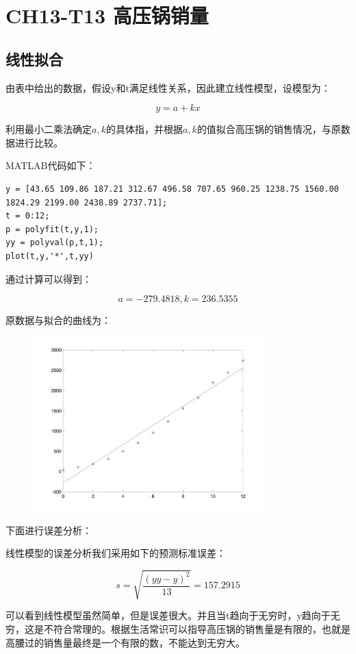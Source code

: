 \documentclass{article}
\begin{document}
\section{CH13-T13 高压锅销量}
\subsection{线性拟合}

由表中给出的数据，假设y和t满足线性关系，因此建立线性模型，设模型为：

$$y = a + kx$$

利用最小二乘法确定$a,k$的具体指，并根据$a,k$的值拟合高压锅的销售情况，与原数据进行比较。

MATLAB代码如下：

\begin{lstlisting}
y = [43.65 109.86 187.21 312.67 496.58 707.65 960.25 1238.75 1560.00 1824.29 2199.00 2438.89 2737.71];
t = 0:12;
p = polyfit(t,y,1);
yy = polyval(p,t,1);
plot(t,y,'*',t,yy)

\end{lstlisting}

通过计算可以得到：

$$a=-279.4818,k=236.5355$$

原数据与拟合的曲线为：

\begin{figure}[H]
    \centering
    \includegraphics[width=0.8\textwidth]{pic24.png}
\end{figure}

下面进行误差分析：

线性模型的误差分析我们采用如下的预测标准误差：

$$s=\sqrt{\frac{(yy-y)^2}{13}}=157.2915$$

可以看到线性模型虽然简单，但是误差很大。并且当t趋向于无穷时，y趋向于无穷，这是不符合常理的。根据生活常识可以指导高压锅的销售量是有限的，也就是高腰过的销售量最终是一个有限的数，不能达到无穷大。
\end{document}
